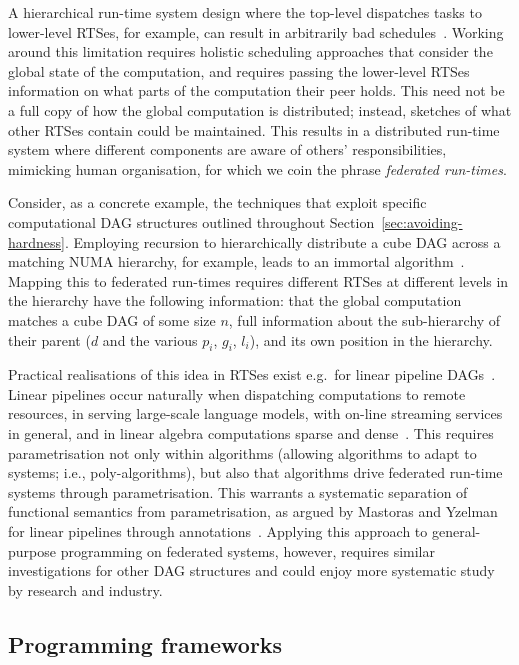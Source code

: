 \documentclass[oneside,reqno, a4paper]{amsart}
\numberwithin{equation}{section}
\begin{document}
A hierarchical run-time system design where the top-level dispatches tasks to lower-level RTSes,
for example,
can result in arbitrarily bad schedules~\cite{hypergraphs_opdas,multiBSP_opdas}.
Working around this limitation requires holistic scheduling approaches that consider the global state of the computation,
and requires passing the lower-level RTSes information on what parts of the computation their peer holds.
This need not be a full copy of how the global computation is distributed;
instead, sketches of what other RTSes contain could be maintained.
This results in a distributed run-time system where different components are aware of others' responsibilities,
mimicking human organisation,
for which we coin the phrase \emph{federated run-times}. %

Consider,
as a concrete example,
the techniques that exploit specific computational DAG structures outlined throughout Section~\ref{sec:avoiding-hardness}.
Employing recursion to hierarchically distribute a cube DAG across a matching NUMA hierarchy,
for example,
leads to an immortal algorithm~\cite{mccoll99,valiant11}.
Mapping this to federated run-times requires
different RTSes at different levels in the hierarchy have the following information:
that the global computation matches a cube DAG of some size $n$,
full information about the sub-hierarchy of their parent ($d$ and  the various $p_i$, $g_i$, $l_i$), and
its own position in the hierarchy.

Practical realisations of this idea in RTSes exist e.g.\ for linear pipeline DAGs~\cite{mastoras18}.
Linear pipelines occur naturally when dispatching computations to remote resources,
in serving large-scale language models,
with on-line streaming services in general, and
in linear algebra computations sparse and dense~\cite{mastoras22a,spampinato23a}.
This requires parametrisation not only within algorithms (allowing algorithms to adapt to systems; i.e., poly-algorithms),
but also that algorithms drive federated run-time systems through parametrisation.
This warrants a systematic separation of functional semantics from parametrisation,
as argued by Mastoras and Yzelman for linear pipelines through annotations~\cite{mastoras23}.
Applying this approach to general-purpose programming on federated systems,
however,
requires similar investigations for other DAG structures and could enjoy more systematic study by research and industry.

\subsection{Programming frameworks}
\end{document}
